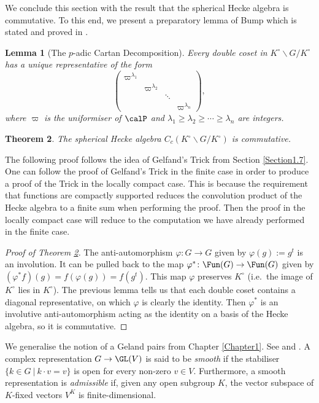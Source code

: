 \documentclass[11pt]{amsart}
\newtheorem{thm}{Theorem}
\newtheorem{lem}[thm]{Lemma}
\theoremstyle{remark}
\begin{document}
We conclude this section with the result that the spherical Hecke algebra is commutative.
To this end, we present a preparatory lemma of Bump which is stated and proved in \cite{Bump10}.
\begin{lem}[The $p$-adic Cartan Decomposition]
	Every double coset in $K^\circ\backslash G/K^\circ$ has a unique representative of the form
	\[
		\begin{pmatrix}
			\varpi^{\lambda_1} &                    &        &                    \\
			                   & \varpi^{\lambda_2} &        &                    \\
			                   &                    & \ddots &                    \\
			                   &                    &        & \varpi^{\lambda_n}
		\end{pmatrix},
	\]
	where $\varpi$ is the uniformiser of $\calP$ and $\lambda_1\geq \lambda_2\geq\cdots\geq\lambda_n$ are integers.
\end{lem}
\begin{thm}\label{sphericalcomm}
	The spherical Hecke algebra $C_c(K^\circ\backslash G/K^\circ)$ is commutative.
\end{thm}
The following proof follows the idea of Gelfand's Trick from Section \ref{Section1.7}.
One can follow the proof of Gelfand's Trick in the finite case in order to produce a proof of the Trick in the locally compact case.
This is because the requirement that functions are compactly supported reduces the convolution product of the Hecke algebra to a finite sum when performing the proof.
Then the proof in the locally compact case will reduce to the computation we have already performed in the finite case.
\begin{proof}[Proof of Theorem \ref{sphericalcomm}]
	The anti-automorphism $\varphi\colon G\to G$ given by $\varphi(g):=g^t$ is an involution.
	It can be pulled back to the map $\varphi^\ast\colon \Fun(G)\to\Fun(G)$ given by $(\varphi^\ast f)(g) = f(\varphi(g)) = f(g^t)$.
	This map $\varphi$ preserves $K^\circ$ (i.e.\ the image of $K^\circ$ lies in $K^\circ$).
	The previous lemma tells us that each double coset contains a diagonal representative, on which $\varphi$ is clearly the identity.
	Then $\varphi^\ast$ is an involutive anti-automorphism acting as the identity on a basis of the Hecke algebra, so it is commutative.
\end{proof}
We generalise the notion of a Geland pairs from Chapter \ref{Chapter1}.
See \cite{Bump10} and \cite{AGS08}.
A complex representation $G\to\GL(V)$ is said to be \emph{smooth} if the stabiliser $\{k\in G\ |\ k\cdot v = v\}$ is open for every non-zero $v\in V$.
Furthermore, a smooth representation is \emph{admissible} if, given any open subgroup $K$, the vector subspace of $K$-fixed vectors $V^K$ is finite-dimensional.
\end{document}
